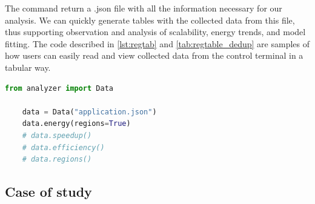 The command return a .json file with all the information necessary for our analysis. We can quickly generate tables with the collected data from this file, thus supporting observation and analysis of scalability, energy trends, and model fitting. The code described in \cref{lst:regtab} and \cref{tab:regtable_dedup} are samples of how users can easily read and view collected data from the control terminal in a tabular way.

\lstset{style=pythonStyle, frame=tb}
\begin{lstlisting}[label={lst:regtab}, language=python, captionpos=b, caption={Example of using the Python API to load analyzer files.}]
	from analyzer import Data
	
	data = Data("application.json")
	data.energy(regions=True)
	# data.speedup()
	# data.efficiency()
	# data.regions()
\end{lstlisting}

\begin{table}[H]
	\caption{Dataframe generated automatically from collected samples using the Python API.}
	\label{tab:regtable_dedup}
	
\end{table}

\subsection{Case of study}\label{subsec:pfv_case_of_study}

